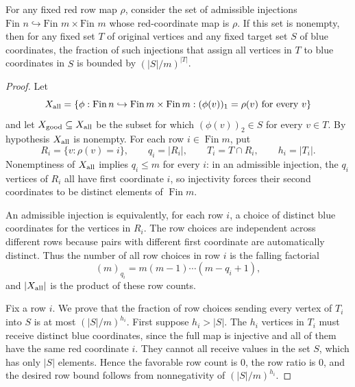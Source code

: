 \begin{lemma}
For any fixed red row map $\rho$, consider the set of admissible injections $\text{Fin } n \hookrightarrow \text{Fin } m \times \text{Fin } m$ whose red-coordinate map is $\rho$. If this set is nonempty, then for any fixed set $T$ of original vertices and any fixed target set $S$ of blue coordinates, the fraction of such injections that assign all vertices in $T$ to blue coordinates in $S$ is bounded by $(|S|/m)^{|T|}$.
\end{lemma}
\begin{proof}
Let
\[
X_{\rm all}
=\{\phi:\operatorname{Fin}n\hookrightarrow
\operatorname{Fin}m\times\operatorname{Fin}m:
(\phi(v))_1=\rho(v)\text{ for every }v\}
\]
and let \(X_{\rm good}\subseteq X_{\rm all}\) be the subset for which
\((\phi(v))_2\in S\) for every \(v\in T\).  By hypothesis
\(X_{\rm all}\) is nonempty.  For each row \(i\in\operatorname{Fin}m\), put
\[
R_i=\{v:\rho(v)=i\},\qquad q_i=|R_i|,\qquad
T_i=T\cap R_i,\qquad h_i=|T_i|.
\]
Nonemptiness of \(X_{\rm all}\) implies \(q_i\le m\) for every \(i\): in an
admissible injection, the \(q_i\) vertices of \(R_i\) all have first
coordinate \(i\), so injectivity forces their second coordinates to be
distinct elements of \(\operatorname{Fin}m\).

An admissible injection is equivalently, for each row \(i\), a choice of
distinct blue coordinates for the vertices in \(R_i\).  The row choices are
independent across different rows because pairs with different first
coordinate are automatically distinct.  Thus the number of all row choices
in row \(i\) is the falling factorial
\[
(m)_{q_i}=m(m-1)\cdots(m-q_i+1),
\]
and \(|X_{\rm all}|\) is the product of these row counts.

Fix a row \(i\).  We prove that the fraction of row choices sending every
vertex of \(T_i\) into \(S\) is at most \((|S|/m)^{h_i}\).  First suppose
\(h_i>|S|\).  The \(h_i\) vertices in \(T_i\) must receive distinct blue
coordinates, since the full map is injective and all of them have the same
red coordinate \(i\).  They cannot all receive values in the set \(S\), which
has only \(|S|\) elements.  Hence the favorable row count is \(0\), the row
ratio is \(0\), and the desired row bound follows from nonnegativity of
\((|S|/m)^{h_i}\).


\end{proof}
